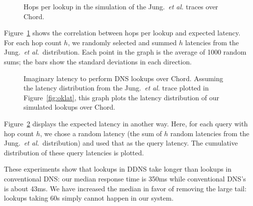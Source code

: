 \begin{figure}[h]
\caption{Hops per lookup in the simulation of the Jung.~{\em et al.} traces
over Chord.}
\label{fig:hopslat}
\end{figure}

Figure~\ref{fig:hopslat} shows the correlation between
hops per lookup and expected latency.
For each hop count $h$, we randomly selected and summed $h$ latencies
from the Jung.~{\em et al.}\ distribution.
Each point in the graph is the average of 1000 random sums;
the bars show the standard deviations in each direction.

\begin{figure}[h]
\caption{Imaginary latency to perform DNS lookups over Chord.
Assuming the latency distribution from the Jung.~{\em et al.} trace plotted
in Figure~\ref{fig:oklat}, this graph plots the latency distribution
of our simulated lookups over Chord.}
\label{fig:imaglat}
\end{figure}

Figure~\ref{fig:imaglat} displays the expected latency
in another way.
Here, for each query with hop count $h$, we chose a random
latency (the sum of $h$ random latencies from the Jung.~{\em et al.}\ distribution)
and used that as the query latency.
The cumulative distribution of these query latencies is plotted.

These experiments show that lookups in DDNS take longer
than lookups in conventional DNS: our median response time is 350ms
while conventional DNS's is about 43ms.
We have increased the median in favor of removing the
large tail: lookups taking 60s simply cannot happen
in our system.





